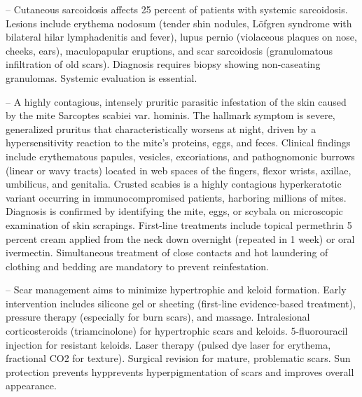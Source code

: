 -- Cutaneous sarcoidosis affects 25 percent of patients with systemic sarcoidosis. Lesions include erythema nodosum (tender shin nodules, Löfgren syndrome with bilateral hilar lymphadenitis and fever), lupus pernio (violaceous plaques on nose, cheeks, ears), maculopapular eruptions, and scar sarcoidosis (granulomatous infiltration of old scars). Diagnosis requires biopsy showing non-caseating granulomas. Systemic evaluation is essential.

-- A highly contagious, intensely pruritic parasitic infestation of the skin caused by the mite Sarcoptes scabiei var. hominis. The hallmark symptom is severe, generalized pruritus that characteristically worsens at night, driven by a hypersensitivity reaction to the mite's proteins, eggs, and feces. Clinical findings include erythematous papules, vesicles, excoriations, and pathognomonic burrows (linear or wavy tracts) located in web spaces of the fingers, flexor wrists, axillae, umbilicus, and genitalia. Crusted scabies is a highly contagious hyperkeratotic variant occurring in immunocompromised patients, harboring millions of mites. Diagnosis is confirmed by identifying the mite, eggs, or scybala on microscopic examination of skin scrapings. First-line treatments include topical permethrin 5 percent cream applied from the neck down overnight (repeated in 1 week) or oral ivermectin. Simultaneous treatment of close contacts and hot laundering of clothing and bedding are mandatory to prevent reinfestation.

-- Scar management aims to minimize hypertrophic and keloid formation. Early intervention includes silicone gel or sheeting (first-line evidence-based treatment), pressure therapy (especially for burn scars), and massage. Intralesional corticosteroids (triamcinolone) for hypertrophic scars and keloids. 5-fluorouracil injection for resistant keloids. Laser therapy (pulsed dye laser for erythema, fractional CO2 for texture). Surgical revision for mature, problematic scars. Sun protection prevents hypprevents hyperpigmentation of scars and improves overall appearance.

